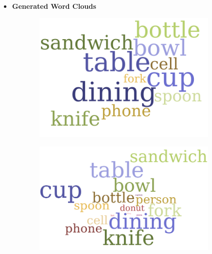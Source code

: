     \begin{itemize}
      \item \textbf{Generated Word Clouds}
    \end{itemize}
    


    \begin{figure}[H]
      \centering
      \captionsetup{justification=centering}
    
      \begin{subfigure}{0.33\textwidth}
      \includegraphics[width=\textwidth]{Sections/4InitialWork/4_images_wordcloud/yolo_pic.png} 
      \caption{}
      \end{subfigure}
      \begin{subfigure}{0.33\textwidth}
      \includegraphics[width=\textwidth]{Sections/4InitialWork/4_images_wordcloud/retina_pic.png}\hfill
      \caption{}
      \end{subfigure}

\end{figure}
